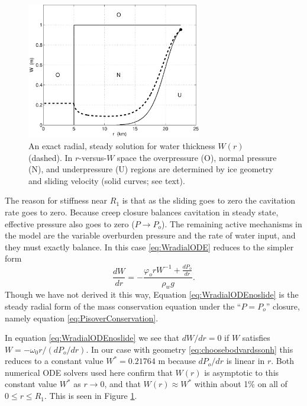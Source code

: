 \documentclass[gmd]{copernicus}   %
\begin{document}
\begin{figure}[ht]
\includegraphics[width=3.0in,keepaspectratio=true]{exact-W-plot-onu}
\caption{An exact radial, steady solution for water thickness $W(r)$ (dashed).  In $r$-versus-$W$ space the overpressure (O), normal pressure (N), and underpressure (U) regions are determined by ice geometry and sliding velocity (solid curves; see text).}
\label{fig:Wexact}
\end{figure}

The reason for stiffness near $R_1$ is that as the sliding goes to zero the cavitation rate goes to zero.  Because creep closure balances cavitation in steady state, effective pressure also goes to zero ($P\to P_o$).  The remaining active mechanisms in the model are the variable overburden pressure and the rate of water input, and they must exactly balance.  In this case \eqref{eq:WradialODE} reduces to the simpler form
\begin{equation}
\frac{dW}{dr} = - \frac{\varphi_o r W^{-1} + \frac{dP_o}{dr}}{\rho_w g}. \label{eq:WradialODEnoslide}
\end{equation}
Though we have not derived it this way, Equation \eqref{eq:WradialODEnoslide} is the steady radial form of the mass conservation equation under the ``$P=P_o$'' closure, namely equation \eqref{eq:PisoverConservation}.

In equation \eqref{eq:WradialODEnoslide} we see that $dW/dr=0$ if $W$ satisfies $W = - \omega_0 r / (dP_o/dr)$.  In our case with geometry \eqref{eq:choosebodvardssonh} this reduces to a constant value $W^*= 0.21764$ m because $dP_o/dr$ is linear in $r$.  Both numerical ODE solvers used here confirm that $W(r)$ is asymptotic to this constant value $W^*$ as $r\to 0$, and that $W(r)\approx W^*$ within about 1\% on all of $0\le r \le R_1$.  This is seen in Figure \ref{fig:Wexact}.
\end{document}
